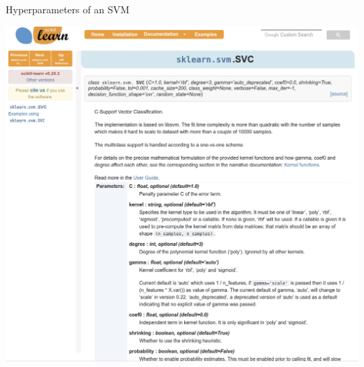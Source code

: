 \begin{frame}[c]{Hyperparameters of an SVM}

\includegraphics[width=1.0\textwidth]{images/sklearn_svm_doc.png}

\end{frame}
